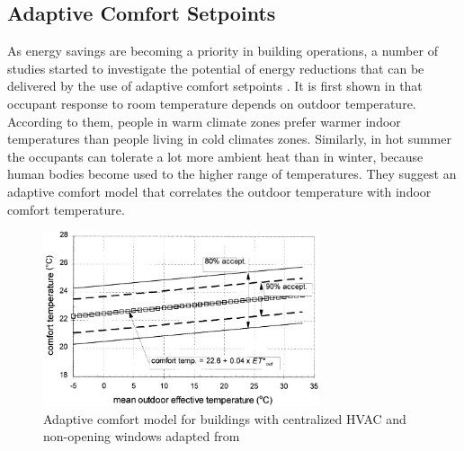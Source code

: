 \subsection{Adaptive Comfort Setpoints}

As energy savings are becoming a priority in building operations, a number of studies started to investigate the potential of energy reductions that can be delivered by the use of adaptive comfort setpoints \citep{mui2003adaptive,egan2010the,schumann2010learning,ward2010automate,yang2013development,west2014trial,chew2015adaptive}. It is first shown in \cite{de1998developing} that occupant response to room temperature depends on outdoor temperature. According to them, people in warm climate zones prefer warmer indoor temperatures than people living in cold climates zones. Similarly, in hot summer the occupants can tolerate a lot more ambient heat than in winter, because human bodies become used to the higher range of temperatures. They suggest an adaptive comfort model that correlates the outdoor temperature with indoor comfort temperature. 

\begin{figure}[b]
\centering
\includegraphics[width=3.2in,keepaspectratio]{./figs/dear_adaptive_thermal_model.jpg}
\caption{Adaptive comfort model for buildings with centralized HVAC and non-opening windows adapted from \cite{de1998developing}}
\label{fig:background:dear_adaptive_temp}
\end{figure}

